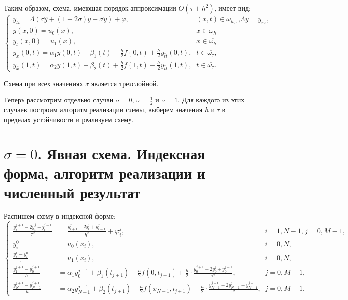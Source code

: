 Таким образом, схема, имеющая порядок аппроксимации $O(\tau + h^{2})$, имеет вид:
\begin{equation}
\left\{
\begin{array}{ll}
y_{\bar{t}t} = \Lambda (\sigma \hat{y} + (1-2\sigma)y + \sigma \check{y}) + \varphi \text{,} & (x,t)\in \omega_{h,\tau} \text{,} \Lambda y = y_{\bar{x}x} \text{,} \\
y(x,0) = u_{0}(x) \text{,} & x \in \overline{\omega_{h}} \\
y_{t}(x,0) = u_{1}(x) \text{,} & x \in \overline{\omega_{h}} \\
y_{x}(0,t) = \alpha_{1}y(0,t)+\beta_{1}(t)-\frac{h}{2}f(0,t)+\frac{h}{2}y_{\bar{t}t}(0,t)\text{,} & t \in \overline{\omega_{\tau}} \text{,} \\
y_{\bar{x}}(1,t) = \alpha_{2}y(1,t)+\beta_{2}(t)+\frac{h}{2}f(1,t)-\frac{h}{2}y_{\bar{t}t}(1,t)\text{,} & t \in \overline{\omega_{\tau}} \text{.}
\end{array}
\right.
\end{equation} \par
Схема при всех значениях $\sigma$ является трехслойной. \par

Теперь рассмотрим отдельно случаи $\sigma=0$, $\sigma=\frac{1}{2}$ и $\sigma=1$. Для каждого из этих случаев построим алгоритм реализации схемы, выберем значения $h$ и $\tau$ в пределах устойчивости и реализуем схему.

\section{$\sigma=0$. Явная схема. Индексная форма, алгоритм реализации и численный результат}
Распишем схему в индексной форме:
\begin{equation}
\left\{
\begin{array}{lll}
\frac{y_{i}^{j+1}-2y_{i}^{j}+y_{i}^{j-1}}{\tau^{2}} & = \frac{y_{i+1}^{j}-2y_{i}^{j}+y_{i-1}^{j}}{h^{2}} + \varphi_{i}^{j}\text{,} & i=\overline{1,N-1}\text{, } j=\overline{0,M-1}\text{,}\\
y_{i}^{0} & = u_{0}(x_{i})\text{,} & i=\overline{0,N}\text{,} \\
\frac{y_{i}^{1}-y_{i}^{0}}{\tau} & = u_{1}(x_{i})\text{,} & i=\overline{0,N}\text{,} \\
\frac{y_{1}^{j+1}-y_{0}^{j+1}}{h} & = \alpha_{1}y_{0}^{j+1} + \beta_{1}(t_{j+1}) - \frac{h}{2}f(0,t_{j+1}) + \frac{h}{2}\cdot\frac{y_{0}^{j+1}-2y_{0}^{j}+y_{0}^{j-1}}{\tau^{2}}\text{,} & j=\overline{0,M-1}\text{,}\\
\frac{y_{N}^{j+1}-y_{N-1}^{j+1}}{h} & = \alpha_{2}y_{N-1}^{j+1} + \beta_{2}(t_{j+1}) + \frac{h}{2}f(x_{N-1},t_{j+1}) - \frac{h}{2}\cdot\frac{y_{N-1}^{j+1}-2y_{N-1}^{j}+y_{N-1}^{j-1}}{\tau^{2}}\text{,} & j=\overline{0,M-1}\text{.}
\end{array}
\right.
\end{equation} \par

